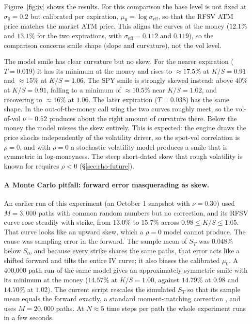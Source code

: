 Figure~\ref{fig:iv} shows the results.  For this comparison the base level is not
fixed at $\sigma_0 = 0.2$ but calibrated per expiration, $\mu_0 = \log\sigma_\mathrm{eff}$,
so that the RFSV ATM price matches the market ATM price.  This aligns the curves at
the money ($12.1\%$ and $13.1\%$ for the two expirations, with
$\sigma_\mathrm{eff} = 0.112$ and $0.119$), so the comparison concerns smile shape
(slope and curvature), not the vol level.

The model smile has clear curvature but no skew.  For the nearer expiration
($T = 0.019$) it has its minimum at the money and rises to $\approx 17.5\%$ at
$K/S = 0.91$ and $\approx 15\%$ at $K/S = 1.06$.  The SPY smile is strongly skewed
instead: above $40\%$ at $K/S = 0.91$, falling to a minimum of $\approx 10.5\%$ near
$K/S = 1.02$, and recovering to $\approx 16\%$ at $1.06$.  The later expiration
($T = 0.038$) has the same shape.  In the out-of-the-money call wing the two curves
roughly meet, so the vol-of-vol $\nu = 0.52$ produces about the right amount of
curvature there.  Below the money the model misses the skew entirely.  This is
expected: the engine draws the price shocks independently of the volatility driver,
so the spot-vol correlation is $\rho = 0$, and with $\rho = 0$ a stochastic volatility
model produces a smile that is symmetric in log-moneyness.  The steep short-dated
skew that rough volatility is known for \citep{gatheral2018volatility} requires
$\rho < 0$ (§\ref{sec:rho-future}).

\paragraph{A Monte Carlo pitfall: forward error masquerading as skew.}
An earlier run of this experiment (an October 1 snapshot with $\nu = 0.30$) used
$M = 3{,}000$ paths with common random numbers but no correction, and its RFSV curve rose steadily with strike, from
$13.0\%$ to $15.7\%$ across $0.98 \leq K/S \leq 1.05$.  That curve looks like an
upward skew, which a $\rho = 0$ model cannot produce.  The cause was sampling
error in the forward.  The sample mean of $S_T$ was $0.048\%$ below $S_0$, and
because every strike shares the same paths, that error acts like a shifted
forward and tilts the entire IV curve; it also biases the calibrated $\mu_0$.  A
400{,}000-path run of the same model gives an approximately symmetric smile with its minimum at
the money ($14.57\%$ at $K/S = 1.00$, against $14.79\%$ at $0.98$ and $14.70\%$
at $1.02$).  The current script rescales the simulated $S_T$ so that its sample
mean equals the forward exactly, a standard moment-matching correction
\citep{glasserman2004monte}, and uses $M = 20{,}000$ paths.  At $N \approx 5$
time steps per path the whole experiment runs in a few seconds.

